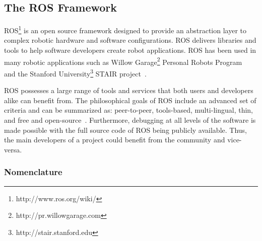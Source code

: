 \subsection*{The ROS Framework}

ROS\footnote{http://www.ros.org/wiki/} is an open source framework designed to provide an abstraction layer to complex robotic hardware and software configurations. ROS delivers libraries and tools to help software developers create robot applications. ROS has been used in many robotic applications such as
Willow Garage\footnote{http://pr.willowgarage.com} Personal Robots Program~\cite{WYOBEK.ICRA.2008} and the Stanford University\footnote{http://stair.stanford.edu}
STAIR project~\cite{QUIGLEY.AAAI.2007}.


ROS possesses a large range of tools and services that both users and developers alike can benefit from. The philosophical goals of ROS include an advanced set of criteria and can be summarized as: peer-to-peer, tools-based, multi-lingual, thin, and free and open-source~\cite{QUIGLEY.ICRA.2009}. Furthermore, debugging at all levels of the software is made possible with the full source code of ROS being publicly available. Thus, the main developers of a project could benefit from the community and vice-versa.

\subsubsection*{Nomenclature}


